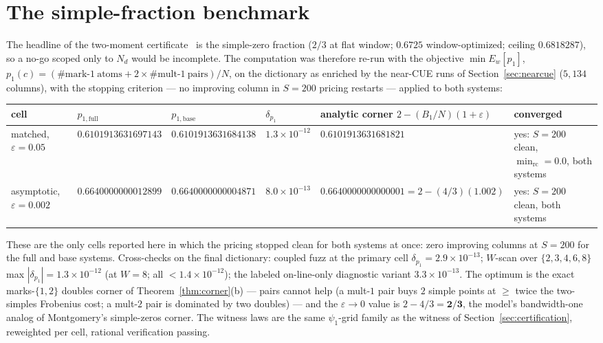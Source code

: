 \documentclass[11pt]{article}
\theoremstyle{plain}
\theoremstyle{definition}
\theoremstyle{remark}
\newcommand{\Nd}{N_{d}}
\begin{document}
\section{The simple-fraction benchmark}
\label{sec:p1}

The headline of the two-moment certificate~\cite{AF26} is the simple-zero
fraction ($2/3$ at flat
window; $0.6725$ window-optimized; ceiling $0.6818287$), so a no-go scoped only
to $\Nd$ would be incomplete. The
computation was therefore re-run with the objective $\min E_w[p_1]$,
$p_1(c) = (\#\text{mark-}1\ \mathrm{atoms}
 + 2 \times \#\text{mult-}1\ \mathrm{pairs})/N$, on the dictionary as enriched by
the near-CUE runs of Section~\ref{sec:nearcue} ($5{,}134$ columns), with the
stopping criterion --- no improving column in $S = 200$ pricing restarts ---
applied to both systems:

\begin{table}[h]
\centering
\footnotesize
\begin{tabular}{@{}>{\raggedright\arraybackslash}p{1.7cm}
                  >{\raggedright\arraybackslash}p{2.9cm}
                  >{\raggedright\arraybackslash}p{2.9cm}
                  >{\raggedright\arraybackslash}p{1.4cm}
                  >{\raggedright\arraybackslash}p{3.2cm}
                  >{\raggedright\arraybackslash}p{2.2cm}@{}}
\toprule
cell & $p_{1,\mathrm{full}}$ & $p_{1,\mathrm{base}}$ & $\delta_{p_1}$ &
analytic corner $2 - (B_1/N)(1 + \varepsilon)$ & converged \\
\midrule
matched, $\varepsilon = 0.05$ & $0.6101913631697143$ &
$0.6101913631684138$ & $1.3 \times 10^{-12}$ & $0.6101913631681821$ &
yes: $S = 200$ clean, $\min_{\mathrm{rc}} = 0.0$, both systems \\
\addlinespace
asymptotic, $\varepsilon = 0.002$ & $0.6640000000012899$ &
$0.6640000000004871$ & $8.0 \times 10^{-13}$ &
$0.6640000000000001 = 2 - (4/3)(1.002)$ &
yes: $S = 200$ clean, both systems \\
\bottomrule
\end{tabular}
\end{table}

These are the only cells reported here in which the pricing stopped clean for
both systems at once: zero improving columns at $S = 200$ for the full and base
systems. Cross-checks on the final dictionary:
coupled fuzz at the primary cell $\delta_{p_1} = 2.9 \times 10^{-13}$; $W$-scan
over $\{2, 3, 4, 6, 8\}$ max $|\delta_{p_1}| = 1.3 \times 10^{-12}$ (at $W = 8$;
all $< 1.4 \times 10^{-12}$); the labeled on-line-only diagnostic variant
$3.3 \times 10^{-13}$. The optimum is the exact marks-$\{1,2\}$ doubles corner of
Theorem~\ref{thm:corner}(b) --- pairs cannot help (a mult-$1$ pair buys $2$
simple points at $\ge$ twice the two-simples Frobenius cost; a mult-$2$ pair is
dominated by two doubles) --- and the $\varepsilon \to 0$ value is
$2 - 4/3 = \mathbf{2/3}$, the model's bandwidth-one analog of Montgomery's
simple-zeros corner. The witness laws are the same $\psi_1$-grid family as the
witness of Section~\ref{sec:certification}, reweighted per cell, rational
verification passing.
\end{document}

